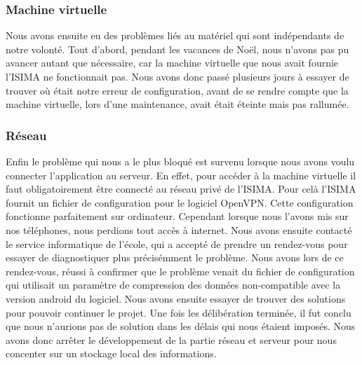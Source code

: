 \subsubsection{Machine virtuelle}
Nous avons ensuite eu des problèmes liés au matériel qui sont indépendants de notre volonté.
Tout d'abord, pendant les vacances de Noël, nous n'avons pas pu avancer autant que nécessaire, car la machine virtuelle que nous avait fournie l'ISIMA ne fonctionnait pas.
Nous avons donc passé plusieurs jours à essayer de trouver où était notre erreur de configuration, avant de se rendre compte que la machine virtuelle, lors d'une maintenance, avait était éteinte mais pas rallumée.
\subsubsection{Réseau}
Enfin le problème qui nous a le plus bloqué est survenu lorsque nous avons voulu connecter l'application au serveur. En effet, pour accéder à la machine virtuelle il faut obligatoirement être connecté au réseau privé de l'ISIMA.
Pour celà l'ISIMA fournit un fichier de configuration pour le logiciel OpenVPN. Cette configuration fonctionne parfaitement sur ordinateur. Cependant lorsque nous l'avons mis sur nos téléphones, nous perdions tout accès à internet.
Nous avons ensuite contacté le service informatique de l'école, qui a accepté de prendre un rendez-vous pour essayer de diagnostiquer plus précisémment le problème. Nous avons lors de ce rendez-vous, réussi à confirmer que le problème venait
du fichier de configuration qui utilisait un paramètre de compression des données non-compatible avec la version android du logiciel. Nous avons ensuite essayer de trouver des solutions pour pouvoir continuer le projet.
Une fois les délibération terminée, il fut conclu que nous n'aurions pas de solution dans les délais qui nous étaient imposés. Nous avons donc arrêter le développement de la partie réseau et serveur pour nous concenter sur un stockage local des informations.

